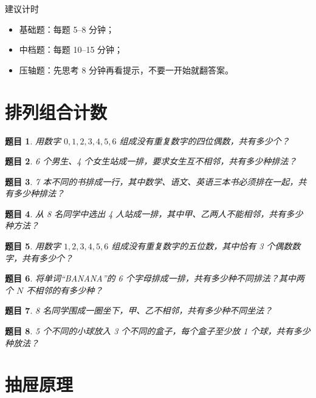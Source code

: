 \documentclass[11pt,a4paper,fontset=fandol]{ctexart}
\theoremstyle{formalexample}
\newtheorem{exercise}{题目}[section]
\begin{document}
\begin{notebox}{建议计时}
\begin{itemize}
  \item 基础题：每题 5--8 分钟；
  \item 中档题：每题 10--15 分钟；
  \item 压轴题：先思考 8 分钟再看提示，不要一开始就翻答案。
\end{itemize}
\end{notebox}

\section{排列组合计数}

\begin{exercise}
用数字 $0,1,2,3,4,5,6$ 组成没有重复数字的四位偶数，共有多少个？
\end{exercise}

\begin{exercise}
6 个男生、4 个女生站成一排，要求女生互不相邻，共有多少种排法？
\end{exercise}

\begin{exercise}
7 本不同的书排成一行，其中数学、语文、英语三本书必须排在一起，共有多少种排法？
\end{exercise}

\begin{exercise}
从 8 名同学中选出 4 人站成一排，其中甲、乙两人不能相邻，共有多少种方法？
\end{exercise}

\begin{exercise}
用数字 $1,2,3,4,5,6$ 组成没有重复数字的五位数，其中恰有 3 个偶数数字，共有多少个？
\end{exercise}

\begin{exercise}
将单词“BANANA”的 6 个字母排成一排，共有多少种不同排法？其中两个 $N$ 不相邻的有多少种？
\end{exercise}

\begin{exercise}
8 名同学围成一圈坐下，甲、乙不相邻，共有多少种不同坐法？
\end{exercise}

\begin{exercise}
5 个不同的小球放入 3 个不同的盒子，每个盒子至少放 1 个球，共有多少种放法？
\end{exercise}

\section{抽屉原理}
\end{document}
